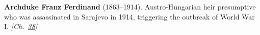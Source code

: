 \textbf{Archduke Franz Ferdinand} (1863–1914). Austro-Hungarian heir presumptive who was assassinated in Sarajevo in 1914, triggering the outbreak of World War I. \emph{[Ch.~\hyperref[ch:christmastruce1914]{38}]}

